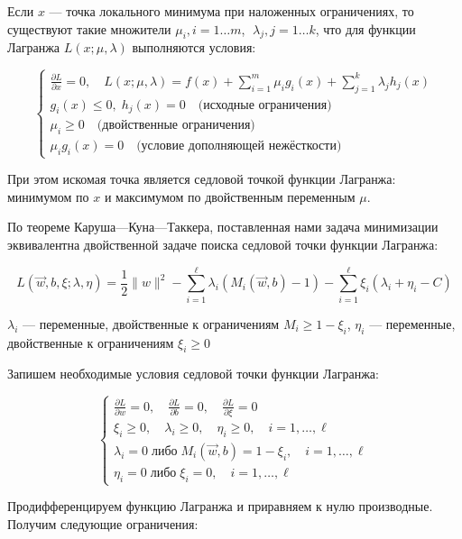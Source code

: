 \bigskip
Если $x$ — точка локального минимума при наложенных ограничениях, то существуют такие множители $\mu_i, i = 1\ldots m$, $\;\lambda_j, j = 1\ldots k$, что для функции Лагранжа $L(x; \mu, \lambda)$ выполняются условия:


$$\begin{cases}\frac{\partial L}{\partial x} = 0, \quad L(x; \mu, \lambda) = f(x) + \sum\limits_{i=1}^m \mu_i g_i(x) + \sum\limits_{j=1}^k \lambda_j h_j(x) \\ g_i(x) \leq 0,\;h_j(x) = 0 \quad \text{(исходные ограничения)} \\ \mu_i \geq 0 \quad \text{(двойственные ограничения)} \\ \mu_i g_i(x) = 0 \quad \text{(условие дополняющей нежёсткости)} \end{cases}$$

\bigskip
При этом искомая точка является седловой точкой функции Лагранжа: минимумом по $x$ и максимумом по двойственным переменным $\mu$.

\bigskip
По теореме Каруша—Куна—Таккера, поставленная нами задача минимизации эквивалентна двойственной задаче поиска седловой точки функции Лагранжа:

$$L(\vec{w},b,\xi; \lambda, \eta) = \frac{1}{2} \lVert w \rVert^2 - \sum\limits_{i=1}^\ell \lambda_i \left(M_i(\vec{w}, b) - 1\right) - \sum\limits_{i=1}^\ell \xi_i \left(\lambda_i + \eta_i - C\right)$$

\bigskip
$\lambda_i$ — переменные, двойственные к ограничениям $M_i \geq 1 - \xi_i$, $\eta_i$ — переменные, двойственные к ограничениям $\xi_i \geq 0$

\bigskip
Запишем необходимые условия седловой точки функции Лагранжа:

\bigskip
\begin{equation}
 \begin{cases}
\frac{\partial L}{\partial w} = 0, \quad \frac{\partial L}{\partial b} = 0, \quad \frac{\partial L}{\partial \xi} = 0 \\
\xi_i \geq 0, \quad \lambda_i \geq 0, \quad \eta_i \geq 0, \quad i = 1, \ldots, \ell \\
\lambda_i = 0 \;\text{либо}\; M_i(\vec{w},b) = 1 - \xi_i, \quad i = 1, \ldots, \ell \\
\eta_i = 0 \;\text{либо}\; \xi_i = 0,\quad i = 1, \ldots, \ell
\end{cases}
\end{equation}

\bigskip
Продифференцируем функцию Лагранжа и приравняем к нулю производные. Получим следующие ограничения:

